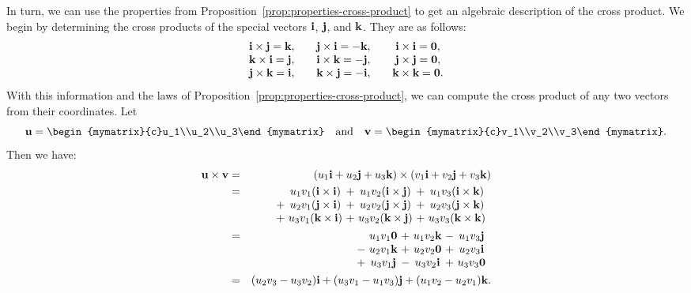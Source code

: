 In turn, we can use the properties from
Proposition~\ref{prop:properties-cross-product} to get an algebraic
description of the cross product. We begin by determining the cross
products of the special vectors $\mbox{\bf i}$, $\mbox{\bf j}$, and
$\mbox{\bf k}$. They are as follows:
\begin{equation*}
  \begin{array}{c@{\quad\quad}c@{\quad\quad}c}
    \vect{i}\times \vect{j}=\vect{k},
    & \vect{j}\times \vect{i}=-\vect{k},
    & \vect{i}\times \vect{i}=\vect{0}, \\
    \vect{k}\times \vect{i}=\vect{j},
    & \vect{i}\times \vect{k}=-\vect{j},
    & \vect{j}\times \vect{j}=\vect{0}, \\
    \vect{j}\times \vect{k}=\vect{i},
    & \vect{k}\times \vect{j}=-\vect{i},
    & \vect{k}\times \vect{k}=\vect{0}.
  \end{array}
\end{equation*}
With this information and the laws of
Proposition~\ref{prop:properties-cross-product}, we can compute the cross
product of any two vectors from their coordinates.
Let
\begin{equation*}
  \vect{u}=\begin{mymatrix}{c}u_1\\u_2\\u_3\end{mymatrix}
  \quad\mbox{and}\quad
  \vect{v}=\begin{mymatrix}{c}v_1\\v_2\\v_3\end{mymatrix}.
\end{equation*}
Then we have:
\begin{eqnarray*}
  \vect{u}\times\vect{v}
  &=& (u_{1}\vect{i}+u_{2}\vect{j}+u_{3}\vect{k})\times (v_{1}\vect{i}+v_{2}\vect{j}+v_{3}\vect{k})\\
  &=& \begin{array}[t]{@{}c@{~}c@{~}c@{~}c@{~}c@{~}c}
          & u_1v_1(\vect{i}\times\vect{i})
        &+& u_1v_2(\vect{i}\times\vect{j})
        &+& u_1v_3(\vect{i}\times\vect{k})\\
         +& u_2v_1(\vect{j}\times\vect{i})
        &+& u_2v_2(\vect{j}\times\vect{j})
        &+& u_2v_3(\vect{j}\times\vect{k})\\
         +& u_3v_1(\vect{k}\times\vect{i})
        &+& u_3v_2(\vect{k}\times\vect{j})
        &+& u_3v_3(\vect{k}\times\vect{k})
      \end{array}
  \\
  &=&\begin{array}[t]{@{}c@{~}c@{~}c@{~}c@{~}c@{~}c}
         & u_1v_1\vect{0}
       &+& u_1v_2\vect{k}
       &-& u_1v_3\vect{j}\\
        -& u_2v_1\vect{k}
       &+& u_2v_2\vect{0}
       &+& u_2v_3\vect{i}\\
        +& u_3v_1\vect{j}
       &-& u_3v_2\vect{i}
       &+& u_3v_3\vect{0}
     \end{array}
  \\
  &=& (u_{2}v_{3}-u_{3}v_{2}) \vect{i}+
      (u_{3}v_{1} - u_{1}v_{3}) \vect{j}+
      (u_{1}v_{2}-u_{2}v_{1}) \vect{k}.
\end{eqnarray*}
